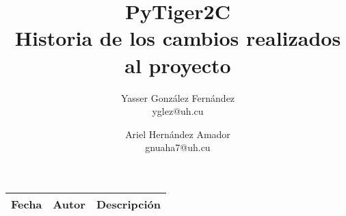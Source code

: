 \documentclass{article}
\title{
	\LARGE{PyTiger2C} \\
	\Large{Historia de los cambios realizados al proyecto}
}
\author{
  	Yasser González Fernández \\
  	\small{yglez@uh.cu}
  	\and
  	Ariel Hernández Amador \\
  	\small{gnuaha7@uh.cu}
}
\date{}
\begin{document}
\maketitle

\thispagestyle{empty}

\newpage

\setcounter{page}{1}

\begin{center}
\begin{longtable}{|l|l|p{18em}|}
\hline 
\textbf{Fecha} & \textbf{Autor} & \textbf{Descripción} \\
\hline

\end{longtable}
\end{center}
\end{document}
